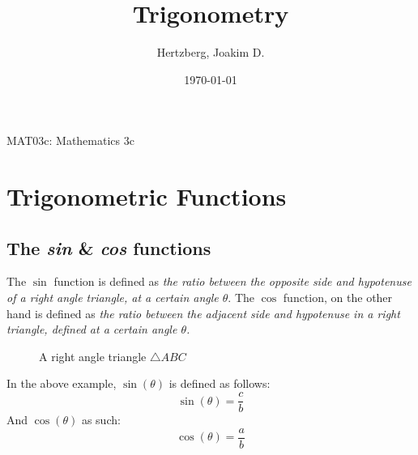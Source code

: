 \documentclass[a4paper, 12pt]{article}
\title{Trigonometry}
\author{Hertzberg, Joakim D.}
\date{\today}
\begin{document}
\begin{titlepage}
\clearpage\maketitle
\begin{center}
MAT03c: Mathematics 3c
\end{center}
\thispagestyle{empty}
\end{titlepage}



\section{Trigonometric Functions}


\subsection{The \emph{sin} \& \emph{cos} functions}


The $\sin$ function is defined as \emph{the ratio between the opposite side and hypotenuse of a right angle triangle, at a certain angle $\theta$}. The $\cos$ function, on the other hand is defined as \emph{the ratio between the adjacent side and hypotenuse in a right triangle, defined at a certain angle $\theta$.}

\begin{figure}
\begin{center}
\end{center}
\caption{A right angle triangle $\triangle ABC$}
\label{fig:tri1}
\end{figure} \bigbreak



In the above example, $\sin(\theta)$ is defined as follows: $$\sin(\theta) = \frac{c}{b}$$
And $\cos(\theta)$ as such: $$\cos(\theta) = \frac{a}{b}$$
\end{document}
